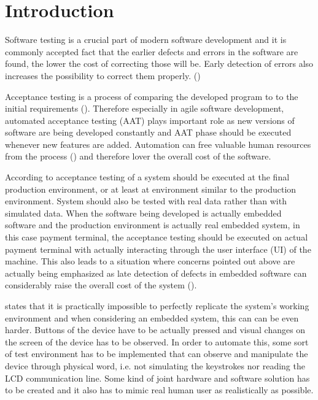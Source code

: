 
\chapter{Introduction}
\label{chapter:intro}

Software testing is a crucial part of modern software development and it is commonly accepted fact that the earlier defects and errors in the software are found, the lower the cost of correcting those will be. Early detection of errors also increases the possibility to correct them properly. (\emph{\cite{myers2011art}})

Acceptance testing is a process of comparing the developed program to to the initial requirements (\emph{\cite{myers2011art}}). Therefore especially in agile software development, automated acceptance testing (AAT) plays important role as new versions of software are being developed constantly and AAT phase should be executed whenever new features are added. Automation can free valuable human resources from the process (\emph{\cite{haugset2008automated}}) and therefore lover the overall cost of the software.

According to \emph{\cite{sommerville2011software}} acceptance testing of a system should be executed at the final production environment, or at least at environment similar to the production environment. System should also be tested with real data rather than with simulated data. When the software being developed is actually embedded software and the production environment is actually real embedded system, in this case payment terminal, the acceptance testing should be executed on actual payment terminal with actually interacting through the user interface (UI) of the machine. This also leads to a situation where concerns pointed out above are actually being emphasized as late detection of defects in embedded software can considerably raise the overall cost of the system (\emph{\cite{ebert2009embedded}}).

\emph{\cite{sommerville2011software}} states that it is practically impossible to perfectly replicate the system's working environment and when considering an embedded system, this can can be even harder. Buttons of the device have to be actually pressed and visual changes on the screen of the device has to be observed. In order to automate this, some sort of test environment has to be implemented that can observe and manipulate the device through physical word, i.e. not simulating the keystrokes nor reading the LCD communication line. Some kind of joint hardware and software solution has to be created and it also has to mimic real human user as realistically as possible.

